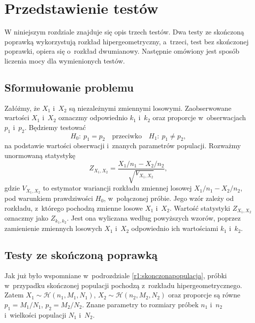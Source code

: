 \chapter{Przedstawienie testów}
\label{r2}
W niniejszym rozdziale znajduje się opis trzech testów. Dwa testy ze skończoną poprawką wykorzystują rozkład hipergeometryczny, a~trzeci, test bez skończonej poprawki, opiera się o~rozkład dwumianowy. Następnie omówiony jest sposób liczenia mocy dla wymienionych testów.

\section{Sformułowanie problemu}
Załóżmy, że $X_1$ i~$X_2$ są niezależnymi zmiennymi losowymi. Zaobserwowane wartości $X_1$ i~$X_2$ oznaczmy odpowiednio $k_1$ i~$k_2$ oraz proporcje w~obserwacjach $p_1$ i~$p_2$. Będziemy testować
\begin{equation}
H_0{:}\ p_1=p_2\quad \text{przeciwko} \quad H_1{:}\ p_1\neq p_2,
\end{equation}
na podstawie wartości obserwacji i~znanych parametrów populacji.
Rozważmy unormowaną statystykę
\begin{equation}
Z_{X_1,X_2} = \frac{X_1/n_1-X_2/n_2}{\sqrt{V_{X_1,X_2}}},
\end{equation}
gdzie $V_{X_1,X_2}$ to estymator wariancji rozkładu zmiennej losowej $X_1/n_1-X_2/n_2$, pod warunkiem prawdziwości $H_0$, w~połączonej próbie. Jego wzór zależy od rozkładu, z~którego pochodzą zmienne losowe $X_1$ i~$X_2$.
Wartość statystyki $Z_{X_1,X_2}$ oznaczmy jako $Z_{k_1,k_2}$. Jest ona wyliczana według powyższych wzorów, poprzez zamienienie zmiennych losowych $X_1$ i~$X_2$ odpowiednio ich wartościami $k_1$ i~$k_2$.

\section{Testy ze skończoną poprawką}
\label{r2:skonczonapoprawka}
Jak już było wspomniane w~podrozdziale \ref{r1:skonczonapopulacja}, próbki w~przypadku skończonej populacji pochodzą z~rozkładu hipergeometrycznego. Zatem $X_1\sim \mathcal{H}(n_1,M_1,N_1)$, $X_2\sim \mathcal{H}(n_2,M_2,N_2)$ oraz proporcje są równe $p_1=M_1/N_1$, $p_2=M_2/N_2$. Znane parametry to rozmiary próbek $n_1$ i~$n_2$ i~wielkości populacji $N_1$ i~$N_2$.

